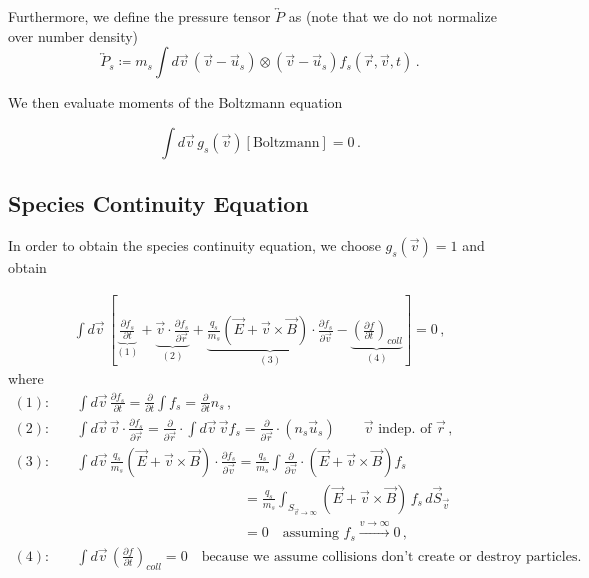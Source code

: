 Furthermore, we define the pressure tensor $\overleftrightarrow{P}$ as (note that we do not normalize over number density)
\[ \overleftrightarrow{P}_s \coloneq m_s \int d\vec{v} \, (\vec{v}-\vec{u}_s) \otimes (\vec{v}-\vec{u}_s) f_s(\vec{r},\vec{v},t) \, .
\]

We then evaluate moments of the Boltzmann equation

\[
\int d\vec{v} \, g_s(\vec{v}) \left[\text{Boltzmann}\right] = 0  \, .
\]

\subsection{Species Continuity Equation}
In order to obtain the species continuity equation, we choose $g_s(\vec{v}) = 1$ and obtain

\begin{align*}
\int d\vec{v} \, \left[\underbrace{\frac{\partial f_s}{\partial t}}_{(1)} + \underbrace{\vec{v} \cdot \frac{\partial f_s}{\partial \vec{r}}}_{(2)} + \underbrace{\frac{q_s}{m_s} (\vec{E} + \vec{v} \times \vec{B}) \cdot \frac{\partial f_s}{\partial \vec{v}}}_{(3)} - \underbrace{\left(\frac{\partial f}{\partial t}\right)_{coll}}_{(4)}\right] = 0  \, ,
\end{align*}
where
\begin{align*}
(1): \quad & \int d\vec{v} \,  \frac{\partial f_s}{\partial t} = \frac{\partial}{\partial t} \int f_s = \frac{\partial}{\partial t} n_s  \, ,\\
(2): \quad & \int d\vec{v} \,  \vec{v} \cdot \frac{\partial f_s}{\partial \vec{r}} = \frac{\partial}{\partial \vec{r}} \cdot \int d\vec{v} \, \vec{v} f_s = \frac{\partial}{\partial \vec{r}} \cdot (n_s \vec{u}_s) \qquad \text{$\vec{v}$ indep. of $\vec{r}$}  \, ,\\
(3): \quad & \int d\vec{v} \,  \frac{q_s}{m_s} (\vec{E} + \vec{v} \times \vec{B}) \cdot \frac{\partial f_s}{\partial \vec{v}} = \frac{q_s}{m_s} \int \frac{\partial}{\partial \vec{v}} \cdot (\vec{E} + \vec{v} \times \vec{B}) f_s \\
& \hspace{5cm}= \frac{q_s}{m_s} \int_{S_{\vec{v} \to \infty}} (\vec{E} + \vec{v} \times \vec{B}) \, f_s \, d\vec{S}_{\vec{v}}\\
&    \hspace{5cm} = 0 \quad\text{assuming } f_s\overset{v\to\infty}{\rightarrow}0 \, ,\\
(4): \quad & \int d\vec{v} \,  \left(\frac{\partial f}{\partial t}\right)_{coll} = 0 \quad \text{because we assume collisions don't create or destroy particles.}
\end{align*}


